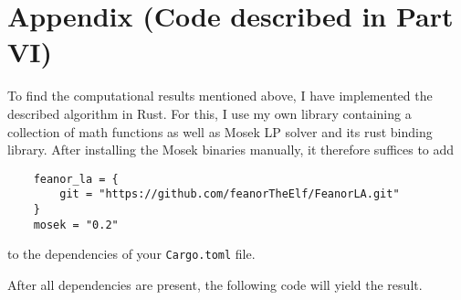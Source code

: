 \documentclass{scrartcl}
\theoremstyle{definition}
\begin{document}
\section{Appendix (Code described in Part VI)}
To find the computational results mentioned above, I have implemented the described algorithm in Rust.
For this, I use my own library containing a collection of math functions as well as Mosek LP solver \cite{mosek} and its rust binding library.
After installing the Mosek binaries manually, it therefore suffices to add
\begin{lstlisting}
    feanor_la = { 
        git = "https://github.com/feanorTheElf/FeanorLA.git"  
    }
    mosek = "0.2"
\end{lstlisting}
to the dependencies of your \texttt{Cargo.toml} file.

After all dependencies are present, the following code will yield the result.


\printbibliography
\end{document}
